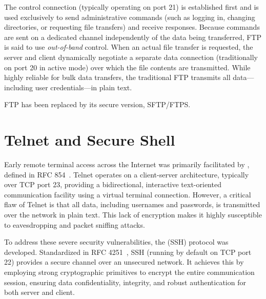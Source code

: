 The control connection (typically operating on port 21) is established first and is used exclusively to send administrative commands (such as logging in, changing directories, or requesting file transfers) and receive responses. Because commands are sent on a dedicated channel independently of the data being transferred, FTP is said to use \emph{out-of-band} control. When an actual file transfer is requested, the server and client dynamically negotiate a separate data connection (traditionally on port 20 in active mode) over which the file contents are transmitted. While highly reliable for bulk data transfers, the traditional FTP transmits all data—including user credentials—in plain text. 

FTP has been replaced by its secure version, SFTP/FTPS.

\section{Telnet and Secure Shell}
Early remote terminal access across the Internet was primarily facilitated by , defined in RFC 854~\cite{rfc854}. Telnet operates on a client-server architecture, typically over TCP port 23, providing a bidirectional, interactive text-oriented communication facility using a virtual terminal connection. However, a critical flaw of Telnet is that all data, including usernames and passwords, is transmitted over the network in plain text. This lack of encryption makes it highly susceptible to eavesdropping and packet sniffing attacks.

To address these severe security vulnerabilities, the  (SSH) protocol was developed. Standardized in RFC 4251~\cite{rfc4251}, SSH (running by default on TCP port 22) provides a secure channel over an unsecured network. It achieves this by employing strong cryptographic primitives to encrypt the entire communication session, ensuring data confidentiality, integrity, and robust authentication for both server and client. 

